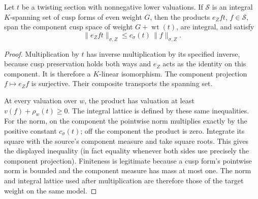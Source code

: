 \begin{srlemma}
\label{lem:ftb-twist-span}
Let \(t\) be a twisting section with nonnegative lower valuations.
If \(\mathcal S\) is an integral \(K\)-spanning set of cusp forms
of even weight \(G\), then the products \(e_Z f t\),
\(f\in\mathcal S\), span the component cusp space of weight
\(G+\operatorname{wt}(t)\), are integral, and satisfy
\[
       \|e_Zft\|_{\sigma,Z}
                          \le c_\sigma(t)\,\|f\|_{\sigma,Z}.
\]
\end{srlemma}
\begin{proof}
Multiplication by \(t\) has inverse multiplication by its specified
inverse, because cusp preservation holds both ways and
\(e_Z\) acts as the identity on this component.
It is therefore a \(K\)-linear isomorphism.
The component projection \(f\mapsto e_Zf\) is surjective.
Their composite transports the spanning set.

At every valuation over \(w\), the product has valuation at least
\(v(f)+\rho_w(t)\ge0\).
The integral lattice is defined by these same inequalities.
For the norm, on the component the pointwise norm multiplies
exactly by the positive constant \(c_\sigma(t)\); off the
component the product is zero.
Integrate its square with the source's component measure and
take square roots.
This gives the displayed inequality (in fact equality whenever
both sides use precisely the component projection).
Finiteness is legitimate because a cusp form's pointwise norm is
bounded and the component measure has mass at most one.
The norm and integral lattice used after multiplication are
therefore those of the target weight on the same model.
\end{proof}

